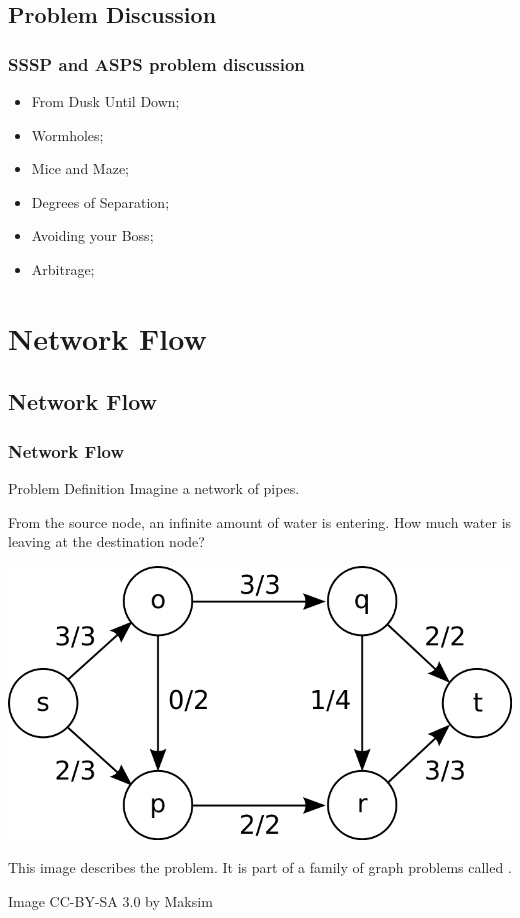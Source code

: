 \documentclass{beamer}
\begin{document}
\subsection{Problem Discussion}
\begin{frame}
  \frametitle{SSSP and ASPS problem discussion}
  {\smaller
  \begin{itemize}
    \item From Dusk Until Down;
    \item Wormholes; 
    \item Mice and Maze; 
    \item Degrees of Separation;
    \item Avoiding your Boss;
    \item Arbitrage;
  \end{itemize}}
\end{frame}

\section{Network Flow}
\subsection{Network Flow}
\begin{frame}
  \frametitle{Network Flow}

  {\small
  \begin{block}{Problem Definition}
    Imagine a  network of pipes.

    From the \alert{source} node, an infinite amount of water is
    entering. How much water is leaving at the \alert{destination}
    node?
  \end{block}

  \begin{center}
    \includegraphics[width=.55\textwidth]{../img/maxflow_wiki}
  \end{center}


  \begin{block}{}
    This image describes the  problem. It is part
    of a family of graph problems called .
  \end{block}}

  \hfill{\tiny Image CC-BY-SA 3.0 by Maksim}
\end{frame}
\end{document}

